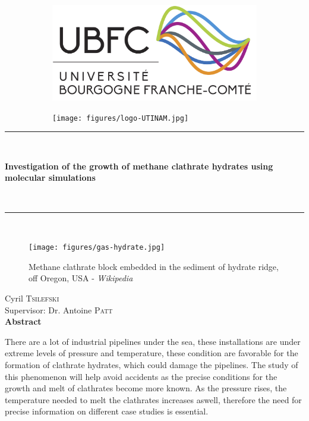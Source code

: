 \thispagestyle{empty}
\setcounter{page}{0}
\begin{center}
    \begin{figure}[!hb]
        \centering
        \begin{subfigure}{.45\linewidth}
            \centering
            \includegraphics[width=.69\linewidth]{figures/logo-ubfc.png}
        \end{subfigure}
        \hfill
        \begin{subfigure}{.45\linewidth}
            \centering
            \texttt{[image: figures/logo-UTINAM.jpg]}
        \end{subfigure}
    \end{figure}
    
    \vspace{1\baselineskip}
    \rule{1\textwidth}{1pt}\\
    \vspace{\baselineskip}
    \begin{Huge}\textbf{Investigation of the growth of methane clathrate hydrates using molecular simulations}\end{Huge}\\
    \vspace{0.5\baselineskip}
    \rule{1\textwidth}{1pt}\\
    \vspace{\baselineskip}
    \begin{figure}[htbp]
        \centering
        \texttt{[image: figures/gas-hydrate.jpg]}
        \caption*{Methane clathrate block embedded in the sediment of hydrate ridge, off Oregon, USA - \textit{Wikipedia}}
    \end{figure}
    \vspace{\baselineskip}
    {\LARGE Cyril \textsc{Tsilefski}}\\
    \vspace{\baselineskip}
    {\large Supervisor: Dr. Antoine \textsc{Patt}}\\
    \vspace{\baselineskip}
    {\centering \large\textbf{Abstract}}
\end{center}
There are a lot of industrial pipelines under the sea, these installations are under extreme levels of pressure and temperature, these condition are favorable for the formation of clathrate hydrates, which could damage the pipelines. The study of this phenomenon will help avoid accidents as the precise conditions for the growth and melt of clathrates become more known. As the pressure rises, the temperature needed to melt the clathrates increases aswell, therefore the need for precise information on different case studies is essential.
\setcounter{figure}{0}
